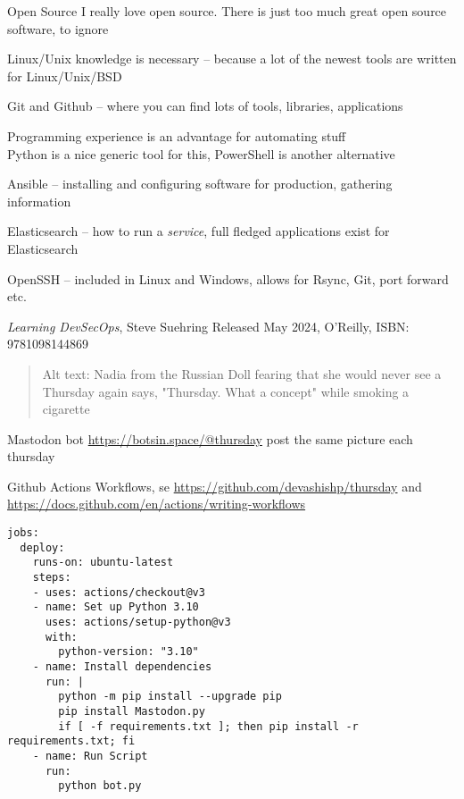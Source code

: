 \documentclass[Screen16to9,17pt]{foils}
\begin{document}
\begin{list2}
\item Open Source I really love open source. There is just too much great open source software, to ignore
\item Linux/Unix knowledge is necessary
-- because a lot of the newest tools are written for Linux/Unix/BSD
\item Git and Github -- where you can find lots of tools, libraries, applications
\item Programming experience is an advantage for automating stuff\\
Python is a nice generic tool for this, PowerShell is another alternative
\item Ansible -- installing and configuring software for production, gathering information
\item Elasticsearch -- how to run a \emph{service}, full fledged applications exist for Elasticsearch
\item OpenSSH -- included in Linux and Windows, allows for Rsync, Git, port forward etc.
\end{list2}



\emph{Learning DevSecOps}, Steve Suehring
Released May 2024, O'Reilly, ISBN: 9781098144869



\begin{quote}
Alt text: Nadia from the Russian Doll fearing that she would never see a Thursday again says, "Thursday. What a concept" while smoking a cigarette
\end{quote}

\begin{list2}
\item Mastodon bot \url{https://botsin.space/@thursday} post the same picture each thursday
\item Github Actions Workflows, se \url{https://github.com/devashishp/thursday} and \url{https://docs.github.com/en/actions/writing-workflows}

\end{list2}


\begin{verbatim}
jobs:
  deploy:
    runs-on: ubuntu-latest
    steps:
    - uses: actions/checkout@v3
    - name: Set up Python 3.10
      uses: actions/setup-python@v3
      with:
        python-version: "3.10"
    - name: Install dependencies
      run: |
        python -m pip install --upgrade pip
        pip install Mastodon.py
        if [ -f requirements.txt ]; then pip install -r requirements.txt; fi
    - name: Run Script
      run:
        python bot.py
\end{verbatim}
\end{document}
